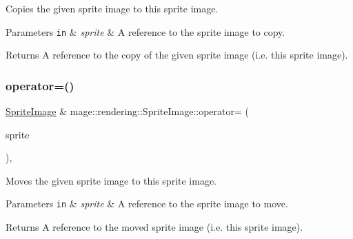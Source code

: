 Copies the given sprite image to this sprite image.


\begin{DoxyParams}[1]{Parameters}
\mbox{\tt in}  & {\em sprite} & A reference to the sprite image to copy. \\
\hline
\end{DoxyParams}
\begin{DoxyReturn}{Returns}
A reference to the copy of the given sprite image (i.\+e. this sprite image). 
\end{DoxyReturn}
\hypertarget{classmage_1_1rendering_1_1_sprite_image_adabb87110ec41d770061d375cb0db000}{}\label{classmage_1_1rendering_1_1_sprite_image_adabb87110ec41d770061d375cb0db000} 
\subsubsection{\texorpdfstring{operator=()}{operator=()}\hspace{0.1cm}{\footnotesize\ttfamily [2/2]}}
{\footnotesize\ttfamily \hyperlink{classmage_1_1rendering_1_1_sprite_image}{Sprite\+Image} \& mage\+::rendering\+::\+Sprite\+Image\+::operator= (\begin{DoxyParamCaption}\item[{\hyperlink{classmage_1_1rendering_1_1_sprite_image}{Sprite\+Image} \&\&}]{sprite }\end{DoxyParamCaption})\hspace{0.3cm}{\ttfamily [default]}, {\ttfamily [noexcept]}}

Moves the given sprite image to this sprite image.


\begin{DoxyParams}[1]{Parameters}
\mbox{\tt in}  & {\em sprite} & A reference to the sprite image to move. \\
\hline
\end{DoxyParams}
\begin{DoxyReturn}{Returns}
A reference to the moved sprite image (i.\+e. this sprite image). 
\end{DoxyReturn}
\hypertarget{classmage_1_1rendering_1_1_sprite_image_a363b30407434dea9d3069142ff8c4059}{}\label{classmage_1_1rendering_1_1_sprite_image_a363b30407434dea9d3069142ff8c4059} 

